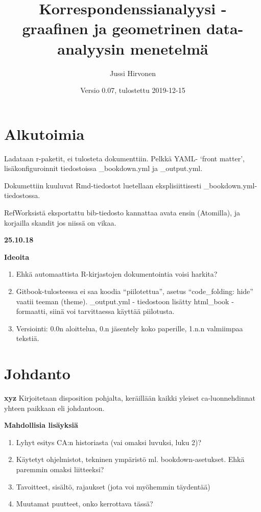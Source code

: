 \documentclass[
  finnish,
]{book}
\title{Korrespondenssianalyysi - graafinen ja geometrinen data-analyysin menetelmä}
\author{Jussi Hirvonen}
\date{Versio 0.07, tulostettu 2019-12-15}
\begin{document}
\frontmatter
\maketitle

{
\setcounter{tocdepth}{2}
\tableofcontents
}
\mainmatter
\hypertarget{alkutoimia}{%
\chapter*{Alkutoimia}\label{alkutoimia}}

Ladataan r-paketit, ei tulosteta dokumenttiin. Pelkkä YAML- `front matter', lisäkonfiguroinnit tiedostoissa \_bookdown.yml ja \_output.yml.

Dokumettiin kuuluvat Rmd-tiedostot luetellaan eksplisiittisesti \_bookdown.yml-tiedostossa.

RefWorksistä eksportattu bib-tiedosto kannattaa avata ensin (Atomilla), ja korjailla skandit jos niissä on vikaa.

\textbf{25.10.18}

\textbf{Ideoita}

\begin{enumerate}
\def\labelenumi{\arabic{enumi}.}
\item
  Ehkä automaattista R-kirjastojen dokumentointia voisi harkita?
\item
  Gitbook-tulosteessa ei saa koodia ``piilotettua'', asetus ``code\_folding: hide'' vaatii teeman (theme). \_output.yml - tiedostoon lisätty html\_book - formaatti, siinä voi tarvittaessa käyttää piilotusta.
\item
  Versiointi: 0.0n aloittelua, 0.n jäsentely koko paperille, 1.n.n valmiimpaa tekstiä.
\end{enumerate}

\hypertarget{johdanto}{%
\chapter{Johdanto}\label{johdanto}}

\textbf{xyz} Kirjoitetaan disposition pohjalta, keräillään kaikki yleiset ca-luonnehdinnat yhteen paikkaan eli johdantoon.

\textbf{Mahdollisia lisäyksiä}

\begin{enumerate}
\def\labelenumi{\arabic{enumi}.}
\item
  Lyhyt esitys CA:n historiasta (vai omaksi luvuksi, luku 2)?
\item
  Käytetyt ohjelmistot, tekninen ympäristö ml. bookdown-asetukset. Ehkä paremmin omaksi liitteeksi?
\item
  Tavoitteet, sisältö, rajaukset (jota voi myöhemmin täydentää)
\item
  Muutamat puutteet, onko kerrottava tässä?
\end{enumerate}
\end{document}
